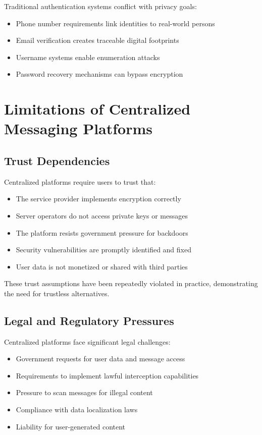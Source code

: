 Traditional authentication systems conflict with privacy goals:
\begin{itemize}
    \item Phone number requirements link identities to real-world persons
    \item Email verification creates traceable digital footprints
    \item Username systems enable enumeration attacks
    \item Password recovery mechanisms can bypass encryption
\end{itemize}

\section{Limitations of Centralized Messaging Platforms}

\subsection{Trust Dependencies}

Centralized platforms require users to trust that:
\begin{itemize}
    \item The service provider implements encryption correctly
    \item Server operators do not access private keys or messages
    \item The platform resists government pressure for backdoors
    \item Security vulnerabilities are promptly identified and fixed
    \item User data is not monetized or shared with third parties
\end{itemize}

These trust assumptions have been repeatedly violated in practice, demonstrating the need for trustless alternatives.

\subsection{Legal and Regulatory Pressures}

Centralized platforms face significant legal challenges:
\begin{itemize}
    \item Government requests for user data and message access
    \item Requirements to implement lawful interception capabilities
    \item Pressure to scan messages for illegal content
    \item Compliance with data localization laws
    \item Liability for user-generated content
\end{itemize}


